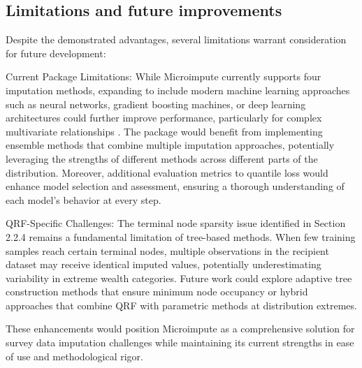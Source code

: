 \subsection{Limitations and future improvements}

Despite the demonstrated advantages, several limitations warrant consideration for future development:

Current Package Limitations:
While Microimpute currently supports four imputation methods, expanding to include modern machine learning approaches such as neural networks, gradient boosting machines, or deep learning architectures could further improve performance, particularly for complex multivariate relationships \citep{alaa2024deep}. The package would benefit from implementing ensemble methods that combine multiple imputation approaches, potentially leveraging the strengths of different methods across different parts of the distribution. Moreover, additional evaluation metrics to quantile loss would enhance model selection and assessment, ensuring a thorough understanding of each model's behavior at every step.

QRF-Specific Challenges:
The terminal node sparsity issue identified in Section 2.2.4 remains a fundamental limitation of tree-based methods. When few training samples reach certain terminal nodes, multiple observations in the recipient dataset may receive identical imputed values, potentially underestimating variability in extreme wealth categories. Future work could explore adaptive tree construction methods that ensure minimum node occupancy or hybrid approaches that combine QRF with parametric methods at distribution extremes.

These enhancements would position Microimpute as a comprehensive solution for survey data imputation challenges while maintaining its current strengths in ease of use and methodological rigor.
